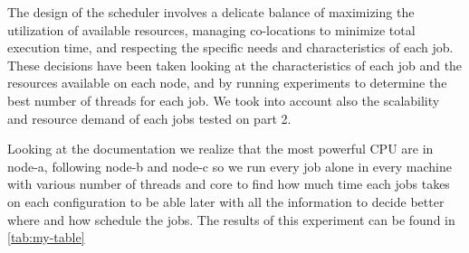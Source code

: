 \begin{enumerate}
\begin{itemize}
        The design of the scheduler involves a delicate balance of maximizing the utilization of available resources, managing co-locations to minimize total execution time, and respecting the specific needs and characteristics of each job. These decisions have been taken looking at the characteristics of each job and the resources available on each node, and by running experiments to determine the best number of threads for each job. We took into account also the scalability and resource demand of each jobs tested on part 2.
        
        Looking at the documentation we realize that the most powerful CPU are in node-a, following node-b and node-c so we run every job alone in every machine with various number of threads and core to find how much time each jobs takes on each configuration to be able later with all the information to decide better where and how schedule the jobs. The results of this experiment can be found in \autoref{tab:my-table}


        \begin{table}[!htp]\centering
            \caption{Runtime (s) of PARSEC jobs on various configurations} \label{tab:my-table}
            \scriptsize
           

\end{table}
\end{itemize}
\end{enumerate}
